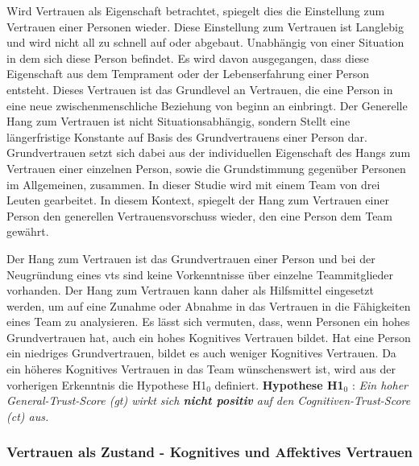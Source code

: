 \documentclass[a4paper,11pt]{article}%
\renewcommand{\\}{\vspace*{0.5\baselineskip} \newline}
\begin{document}
Wird Vertrauen als Eigenschaft betrachtet, spiegelt dies die Einstellung zum Vertrauen einer Personen wieder. Diese Einstellung zum Vertrauen ist Langlebig und wird nicht all zu schnell auf oder abgebaut. Unabhängig von einer Situation in dem sich diese Person befindet. Es wird davon ausgegangen, dass diese Eigenschaft aus dem Temprament oder der Lebenserfahrung einer Person entsteht. Dieses Vertrauen ist das Grundlevel an Vertrauen, die eine Person in eine neue zwischenmenschliche Beziehung von beginn an einbringt.\\
Der Generelle Hang zum Vertrauen ist nicht Situationsabhängig, sondern Stellt eine längerfristige Konstante auf Basis des Grundvertrauens einer Person dar.
Grundvertrauen setzt sich dabei aus der individuellen Eigenschaft des Hangs zum Vertrauen einer einzelnen Person, sowie die Grundstimmung gegenüber Personen im Allgemeinen, zusammen. \citep{couch1996assessment} 
\\
In dieser Studie wird mit einem Team von drei Leuten gearbeitet. In diesem Kontext, spiegelt der Hang zum Vertrauen einer Person den generellen Vertrauensvorschuss wieder, den eine Person dem Team gewährt. 

Der Hang zum Vertrauen ist das Grundvertrauen einer Person und bei der Neugründung eines \ac{vts} sind keine Vorkenntnisse über einzelne Teammitglieder vorhanden. Der Hang zum Vertrauen kann daher als  Hilfsmittel eingesetzt werden, um auf eine Zunahme oder Abnahme in das Vertrauen in die Fähigkeiten eines Team zu analysieren.
Es lässt sich vermuten, dass, wenn Personen ein hohes Grundvertrauen hat, auch ein hohes Kognitives Vertrauen bildet. Hat eine Person ein niedriges Grundvertrauen, bildet es auch weniger Kognitives Vertrauen. 
\\
Da ein höheres Kognitives Vertrauen in das Team wünschenswert ist, wird aus der vorherigen Erkenntnis die Hypothese H1$_{0}$ definiert.
\\
\textbf{Hypothese H1$_{0}$} : \textit{Ein hoher General-Trust-Score (\ac{gt}) wirkt sich \textbf{nicht positiv} auf den Cognitiven-Trust-Score (\ac{ct}) aus.}

	\subsubsection{Vertrauen als Zustand - Kognitives und Affektives Vertrauen}
\end{document}
